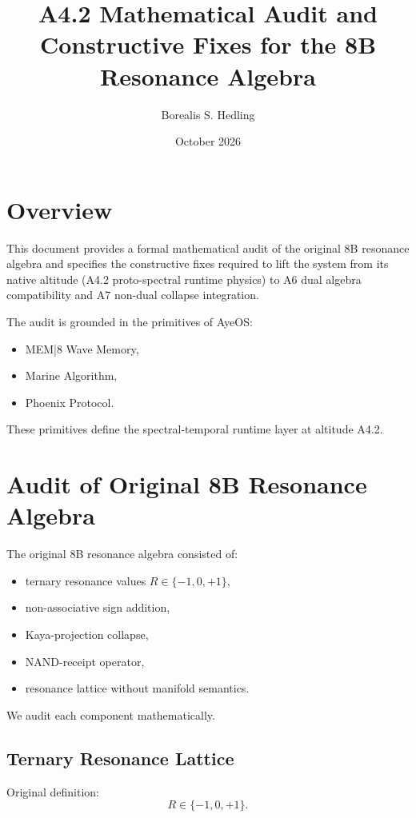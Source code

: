 \documentclass[11pt]{article}
\title{A4.2 Mathematical Audit and Constructive Fixes for the 8B Resonance Algebra}
\author{Borealis S. Hedling}
\date{October 2026}
\begin{document}
\maketitle

\section*{Overview}

This document provides a formal mathematical audit of the original 8B
resonance algebra and specifies the constructive fixes required to lift
the system from its native altitude (A4.2 proto-spectral runtime physics)
to A6 dual algebra compatibility and A7 non-dual collapse integration.

The audit is grounded in the primitives of AyeOS:
\begin{itemize}
  \item MEM|8 Wave Memory,
  \item Marine Algorithm,
  \item Phoenix Protocol.
\end{itemize}

These primitives define the spectral-temporal runtime layer at altitude A4.2.

\section{Audit of Original 8B Resonance Algebra}

The original 8B resonance algebra consisted of:
\begin{itemize}
  \item ternary resonance values $R \in \{-1,0,+1\}$,
  \item non-associative sign addition,
  \item Kaya-projection collapse,
  \item NAND-receipt operator,
  \item resonance lattice without manifold semantics.
\end{itemize}

We audit each component mathematically.

\subsection{Ternary Resonance Lattice}

Original definition:
\[
R \in \{-1,0,+1\}.
\]
\end{document}
